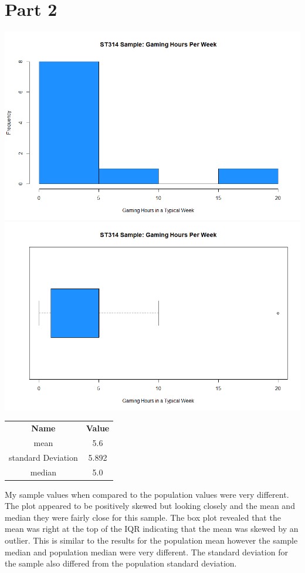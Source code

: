 \documentclass[letterpaper, onecolumn,10pt]{IEEEtran}
\begin{document}
        \section{Part 2}		
        \includegraphics[width=\textwidth]{week3/Images/Histogram2.png}
        \includegraphics[width=\textwidth]{week3/Images/BoxPlot2.png}
        \begin{table}[H]
            \begin{tabular}{|c|c|}
                \textbf{Name} & \textbf{Value} \\
                 mean & 5.6\\
                 standard Deviation & 5.892\\
                 median & 5.0\\
            \end{tabular}
        \end{table}
        
        My sample values when compared to the population values were very different. The plot appeared to be positively skewed but looking closely and the mean and median they were fairly close for this sample. The box plot revealed that the mean was right at the top of the IQR indicating that the mean was skewed by an outlier. This is similar to the results for the population mean however the sample median and population median were very different. The standard deviation for the sample also differed from the population standard deviation.\\
        
        
		
\end{document}

